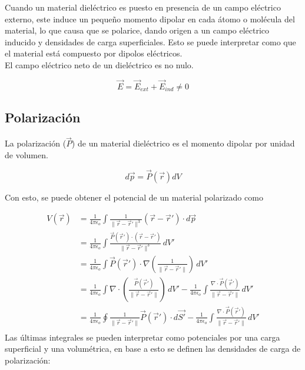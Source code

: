 Cuando un material dieléctrico es puesto en presencia de un campo eléctrico externo, este induce un pequeño momento dipolar en cada átomo o molécula del material, lo que causa que se polarice, dando origen a un campo eléctrico inducido y densidades de carga superficiales. Esto se puede interpretar como que el material está compuesto por dipolos eléctricos.\\

El campo eléctrico neto de un dieléctrico es no nulo.

\[\Vec{E} = \Vec{E}_{ext}+\Vec{E}_{ind} \neq 0\]


\subsection{Polarización}

La polarización ($\Vec{P}$) de un material dieléctrico es el momento dipolar por unidad de volumen.

\[d\Vec{p}=\Vec{P}(\Vec{r})dV\]

Con esto, se puede obtener el potencial de un material polarizado como

\begin{equation}
\begin{split}
    V(\Vec{r}) &= \frac{1}{4\pi\epsilon_o}\int
    \frac{1}{\|\Vec{r}-\Vec{r}'\|^3}(\Vec{r}-\Vec{r}')
    \cdot d\Vec{p}\\
    &= \frac{1}{4\pi\epsilon_o}\int
    \frac{\Vec{P}(\Vec{r}')\cdot(\Vec{r}-\Vec{r}')}{\|\Vec{r}-\Vec{r}'\|^3}\,dV'\\
    &= \frac{1}{4\pi\epsilon_o}\int\Vec{P}(\Vec{r}')\cdot
    \nabla\left(\frac{1}{\|\Vec{r}-\Vec{r}'\|}\right)\,dV'\\
    &= \frac{1}{4\pi\epsilon_o}\int\nabla\cdot\left(
    \frac{\Vec{P}(\Vec{r}')}{\|\Vec{r}-\Vec{r}'\|}\right)\,dV'-\frac{1}{4\pi\epsilon_o}\int
    \frac{\nabla\cdot\Vec{P}(\Vec{r}')}{\|\Vec{r}-\Vec{r}'\|}
    \,dV'\\
    &= \frac{1}{4\pi\epsilon_o}\oint
    \frac{1}{\|\Vec{r}-\Vec{r}'\|}
    \Vec{P}(\Vec{r}')\cdot d\Vec{S'}-\frac{1}{4\pi\epsilon_o}\int
    \frac{\nabla\cdot\Vec{P}(\Vec{r}')}{\|\Vec{r}-\Vec{r}'\|}
    \,dV'\\
\end{split}
\nonumber
\end{equation}
\bigbreak
Las últimas integrales se pueden interpretar como potenciales por una carga superficial y una volumétrica, en base a esto se definen las densidades de carga de polarización:

